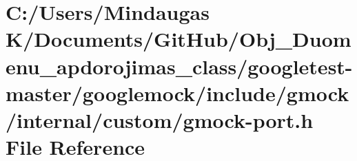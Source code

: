 \hypertarget{googletest-master_2googlemock_2include_2gmock_2internal_2custom_2gmock-port_8h}{}\section{C\+:/\+Users/\+Mindaugas K/\+Documents/\+Git\+Hub/\+Obj\+\_\+\+Duomenu\+\_\+apdorojimas\+\_\+class/googletest-\/master/googlemock/include/gmock/internal/custom/gmock-\/port.h File Reference}
\label{googletest-master_2googlemock_2include_2gmock_2internal_2custom_2gmock-port_8h}

